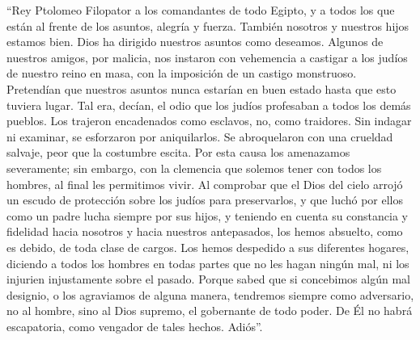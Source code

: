  ``Rey Ptolomeo Filopator a los comandantes de todo
Egipto, y a todos los que están al frente de los asuntos, alegría y
fuerza.  También nosotros y nuestros hijos estamos bien.
Dios ha dirigido nuestros asuntos como deseamos.  Algunos
de nuestros amigos, por malicia, nos instaron con vehemencia a castigar
a los judíos de nuestro reino en masa, con la imposición de un castigo
monstruoso.  Pretendían que nuestros asuntos nunca
estarían en buen estado hasta que esto tuviera lugar. Tal era, decían,
el odio que los judíos profesaban a todos los demás pueblos.
 Los trajeron encadenados como esclavos, no, como
traidores. Sin indagar ni examinar, se esforzaron por aniquilarlos. Se
abroquelaron con una crueldad salvaje, peor que la costumbre escita.
 Por esta causa los amenazamos severamente; sin embargo,
con la clemencia que solemos tener con todos los hombres, al final les
permitimos vivir. Al comprobar que el Dios del cielo arrojó un escudo de
protección sobre los judíos para preservarlos, y que luchó por ellos
como un padre lucha siempre por sus hijos,  y teniendo en
cuenta su constancia y fidelidad hacia nosotros y hacia nuestros
antepasados, los hemos absuelto, como es debido, de toda clase de
cargos.  Los hemos despedido a sus diferentes hogares,
diciendo a todos los hombres en todas partes que no les hagan ningún
mal, ni los injurien injustamente sobre el pasado.  Porque
sabed que si concebimos algún mal designio, o los agraviamos de alguna
manera, tendremos siempre como adversario, no al hombre, sino al Dios
supremo, el gobernante de todo poder. De Él no habrá escapatoria, como
vengador de tales hechos. Adiós''.

